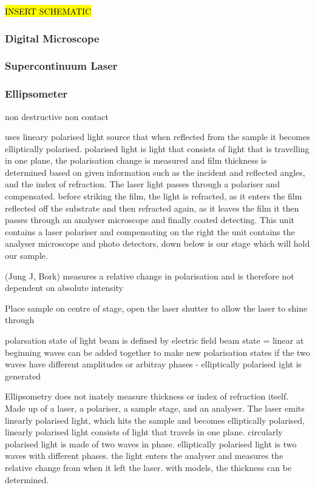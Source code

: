 \documentclass{article}
\begin{document}
\hl{INSERT SCHEMATIC}



\subsubsection{Digital Microscope}

\subsubsection{Supercontinuum Laser}



\subsubsection{Ellipsometer}
non destructive 
non contact 

uses lineary polarised light source that when reflected from the sample it becomes
elliptically polarised. polarised light is light that consists of light that is travelling in 
one plane, the polarisation change is measured and film thickness is determined based on 
given information such as the incident and reflected angles, and the index of refraction.
The laser light passes through a polariser and compensated. before striking the film, the light
is refracted, as it enters the film reflected off the substrate and then refracted again, as 
it leaves the film it then passes through an analyser microscope and finally coated 
detecting. This unit contains a laser polariser and compensating on the right 
the unit contains the analyser microscope and photo detectors, down below is our stage 
which will hold our sample.


(Jung J, Bork)
measures a relative change in polarisation and is therefore not dependent on absolute 
intensity

Place sample on centre of stage, open the laser shutter to allow the laser to shine through 

polarsation state of light beam is defined by electric field 
beam state = linear at beginning 
waves can be added together to make new polarisation states 
if the two waves have different amplitudes or arbitray phases - elliptically polarised ight is generated 

Ellipsometry does not inately measure thickness or index of refraction itself. 
Made up of a laser, a polariser, a sample stage, and an analyser.
The laser emits linearly polarised light, which hits the sample and becomes elliptically polarised,
linearly polarised light consists of light that travels in one plane. circularly polarised light 
is made of two waves in phase. elliptically polarised light is two waves with different phases.
the light enters the analyser and measures the relative change from when it left the laser.
with models, the thickness can be determined.
\end{document}
